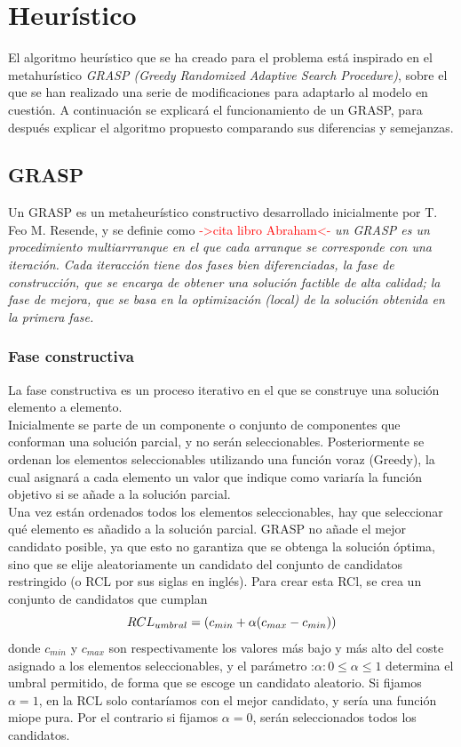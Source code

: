 \chapter{Heurístico}
El algoritmo heurístico que se ha creado para el problema está inspirado en el metahurístico \textit{GRASP (Greedy Randomized Adaptive Search Procedure)}, sobre el que se han realizado una serie de modificaciones para adaptarlo al modelo en cuestión. A continuación se explicará el funcionamiento de un GRASP, para después explicar el algoritmo propuesto comparando sus diferencias y semejanzas.

\section{GRASP}
Un GRASP es un metaheurístico constructivo desarrollado inicialmente por T. Feo   M. Resende, y se definie como \textcolor{red}{->cita libro Abraham<-} \textit{un GRASP es un procedimiento multiarrranque en el que cada arranque se corresponde con una iteración. Cada iteracción tiene dos fases bien diferenciadas, la fase de construcción, que se encarga de obtener una solución factible de alta calidad; la fase de mejora, que se basa en la optimización (local) de la solución obtenida en la primera fase.}

\subsection{Fase constructiva}
La fase constructiva es un proceso iterativo en el que se construye una solución elemento a elemento.\\
Inicialmente se parte de un componente o conjunto de componentes que conforman una solución parcial, y no serán seleccionables. Posteriormente se ordenan los elementos seleccionables utilizando una función voraz (Greedy), la cual asignará a cada elemento un valor que indique como variaría la función objetivo si se añade a la solución parcial.\\
Una vez están ordenados todos los elementos seleccionables, hay que seleccionar qué elemento es añadido a la solución parcial. GRASP no añade el mejor candidato posible, ya que esto no garantiza que se obtenga la solución óptima, sino que se elije aleatoriamente un candidato del conjunto de candidatos restringido (o RCL por sus siglas en inglés). Para crear esta RCl, se crea un conjunto de candidatos que cumplan
\begin{equation}\\
{RCL}_{umbral} = (c_{min}+\alpha(c_{max} - c_{min} ))
\end{equation}
donde $c_{min}$ y $c_{max}$ son respectivamente los valores más bajo y más alto del coste asignado a los elementos seleccionables, y el parámetro  :$\alpha : 0\leq \alpha \leq1$ determina el umbral permitido, de forma que se escoge un candidato aleatorio. Si fijamos $\alpha=1$, en la RCL solo contaríamos con el mejor candidato, y sería una función miope pura. Por el contrario si fijamos $\alpha=0$, serán seleccionados todos los candidatos.\\

